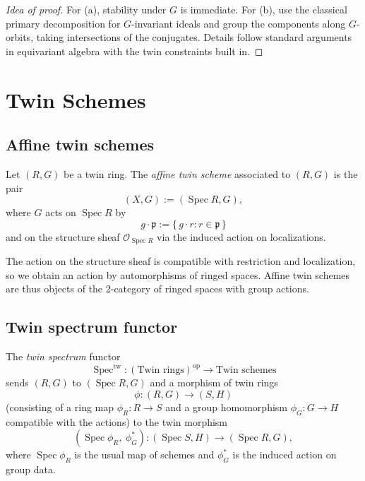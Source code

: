 \documentclass[11pt,a4paper]{article}
\numberwithin{equation}{section}
\DeclareMathOperator{\Spec}{Spec}
\newcommand{\TwinRing}{(R,G)}
\newcommand{\TwinScheme}{(X,G)}
\newcommand{\Ocal}{\mathcal{O}}
\begin{document}
	\begin{proof}[Idea of proof]
		For (a), stability under $G$ is immediate. For (b), use the classical primary decomposition for $G$-invariant ideals 
		and group the components along $G$-orbits, taking intersections of the conjugates.
		Details follow standard arguments in equivariant algebra with the twin constraints built in.
	\end{proof}
	
	\section{Twin Schemes}
	\label{sec:twin-schemes}
	
	\subsection{Affine twin schemes}
	
	\begin{definition}
		Let $(R,G)$ be a twin ring.
		The \emph{affine twin scheme} associated to $\TwinRing$ is the pair
		\[
		\TwinScheme := (\Spec R, G),
		\]
		where $G$ acts on $\Spec R$ by
		\[
		g\cdot\mathfrak{p} := \{\, g\cdot r : r\in\mathfrak{p}\,\}
		\]
		and on the structure sheaf $\Ocal_{\Spec R}$ via the induced action on localizations.
	\end{definition}
	
	\begin{remark}
		The action on the structure sheaf is compatible with restriction and localization, so we obtain
		an action by automorphisms of ringed spaces. Affine twin schemes are thus objects of the 
		2-category of ringed spaces with group actions.
	\end{remark}
	
	\subsection{Twin spectrum functor}
	
	\begin{definition}
		The \emph{twin spectrum} functor
		\[
		\Spec^{\mathrm{tw}} : (\text{Twin rings})^{\mathrm{op}} \to \text{Twin schemes}
		\]
		sends $(R,G)$ to $(\Spec R,G)$ and a morphism of twin rings
		\[
		\phi:(R,G)\to (S,H)
		\]
		(consisting of a ring map $\phi_R:R\to S$ and a group homomorphism $\phi_G:G\to H$
		compatible with the actions) to the twin morphism
		\[
		(\Spec \phi_R,\ \phi_G^\ast) : (\Spec S,H)\to(\Spec R,G),
		\]
		where $\Spec\phi_R$ is the usual map of schemes and $\phi_G^\ast$ is the induced action on group data.
	\end{definition}
	
\end{document}
